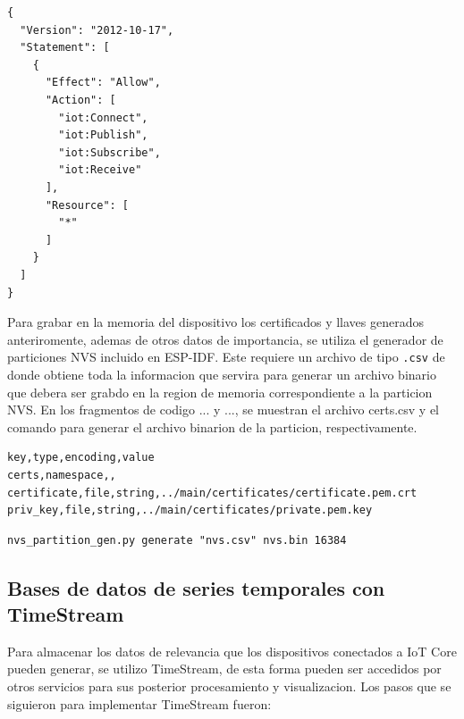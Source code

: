 \begin{lstlisting}[label=cod:policie_json,caption=Politica de acceso asociada a los certificados de los dispositivos.]
{
  "Version": "2012-10-17",
  "Statement": [
    {
      "Effect": "Allow",
      "Action": [
        "iot:Connect",
        "iot:Publish",
        "iot:Subscribe",
        "iot:Receive"
      ],
      "Resource": [
        "*"
      ]
    }
  ]
}
\end{lstlisting}

Para grabar en la memoria del dispositivo los certificados y llaves generados anteriromente, ademas de otros datos de importancia, se utiliza el generador de particiones NVS incluido en ESP-IDF. Este requiere un archivo de tipo \texttt{.csv} de donde obtiene toda la informacion que servira para generar un archivo binario que debera ser grabdo en la region de memoria correspondiente a la particion NVS. En los fragmentos de codigo ... y ..., se muestran el archivo certs.csv y el comando para generar el archivo binarion de la particion, respectivamente.

\begin{lstlisting}[label=cod:policie_json,caption=Archivo nvs.csv.]
key,type,encoding,value    
certs,namespace,,  
certificate,file,string,../main/certificates/certificate.pem.crt
priv_key,file,string,../main/certificates/private.pem.key
\end{lstlisting}

\begin{lstlisting}[label=cod:policie_json,caption=Comando para crear una particion con el generador de particiones NVS]
nvs_partition_gen.py generate "nvs.csv" nvs.bin 16384
\end{lstlisting}

\subsection{Bases de datos de series temporales con TimeStream}
Para almacenar los datos de relevancia que los dispositivos conectados a IoT Core pueden generar, se utilizo TimeStream, de esta forma pueden ser accedidos por otros servicios para sus posterior procesamiento y visualizacion. Los pasos que se siguieron para implementar TimeStream fueron:

